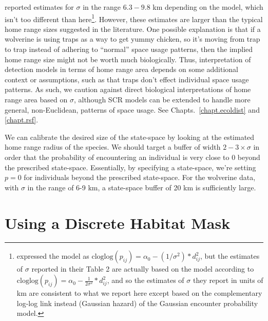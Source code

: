 \citet{royle_etal:2011jwm} reported estimates for $\sigma$ in the
range
$6.3-9.8$
km depending on the model, which isn't too different than
here\footnote{ \citet{royle_etal:2011jwm} expressed the model as
  $\mbox{cloglog}(p_{ij}) = \alpha_{0} - (1/\sigma^2)*d_{ij}^2$, but
  the estimates of $\sigma$ reported in their Table 2 are actually
  based on the model according to $\mbox{cloglog}(p_{ij}) = \alpha_{0}
  - \frac{1}{2\sigma^{2}}*d_{ij}^2$, and so the estimates of $\sigma$
  they report in units of km are consistent to what we report here
  except based on the complementary log-log link instead (Gaussian
  hazard) of the Gaussian encounter probability model. }.  However,
these estimates are larger than the typical home range sizes suggested
in the literature.  One possible explanation is that if a wolverine is
using traps as a way to get yummy chicken, so it's moving from trap to
trap instead of adhering to ``normal'' space usage patterns, then the
implied home range size might not be worth much biologically.  Thus,
interpretation of detection models in terms of home range area depends
on some additional context or assumptions, such as that traps don't
effect individual space usage patterns. As such, we caution against
direct biological interpretations of home range area based on
$\sigma$, although SCR models can be extended to handle more general,
non-Euclidean, patterns of space usage. See Chapts.~\ref{chapt.ecoldist}
and \ref{chapt.rsf}.

We can calibrate the desired size of the state-space by looking at the
estimated home range radius of the species. We should target a buffer
of width $2-3 \times \sigma$ in order that the probability of
encountering an individual is very close to 0 beyond the prescribed
state-space. Essentially, by specifying a state-space, we're setting
$p=0$ for individuals beyond the prescribed state-space. For the
wolverine data, with $\sigma$ in the range of 6-9 km, a state-space
buffer of 20 km is sufficiently large.


\section{Using a Discrete Habitat Mask}
\label{scr0.sec.discrete}

